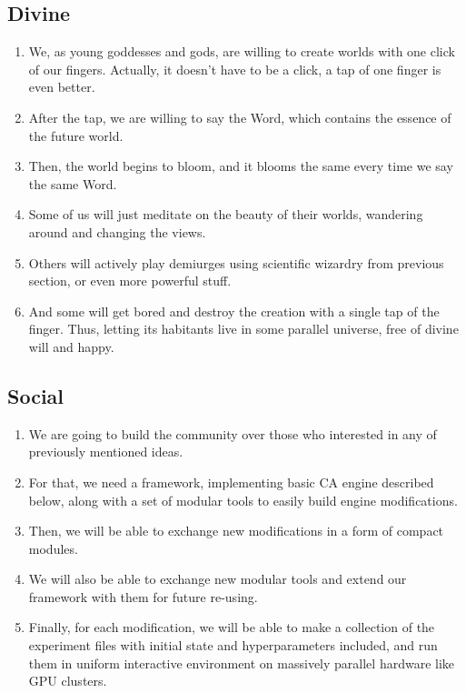 \documentclass[a4paper,12pt,tikz,UTF8]{article}
\begin{document}
  \subsection{Divine}

  \begin{enumerate}
    \item We, as young goddesses and gods, are willing to create worlds with one click of our fingers. Actually, it doesn't have to be a click, a tap of one finger is even better.
    \item After the tap, we are willing to say the Word, which contains the essence of the future world.
    \item Then, the world begins to bloom, and it blooms the same every time we say the same Word.
    \item Some of us will just meditate on the beauty of their worlds, wandering around and changing the views.
    \item Others will actively play demiurges using scientific wizardry from previous section, or even more powerful stuff.
    \item And some will get bored and destroy the creation with a single tap of the finger. Thus, letting its habitants live in some parallel universe, free of divine will and happy.
  \end{enumerate}

  \subsection{Social}

  \begin{enumerate}
    \item We are going to build the community over those who interested in any of previously mentioned ideas.
    \item For that, we need a framework, implementing basic CA engine described below, along with a set of modular tools to easily build engine modifications.
    \item Then, we will be able to exchange new modifications in a form of compact modules.
    \item We will also be able to exchange new modular tools and extend our framework with them for future re-using.
    \item Finally, for each modification, we will be able to make a collection of the experiment files with initial state and hyperparameters included, and run them in uniform interactive environment on massively parallel hardware like GPU clusters.
  \end{enumerate}
\end{document}
